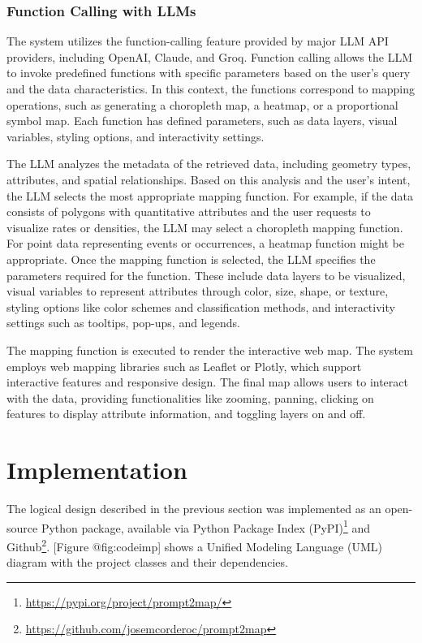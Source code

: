\subsubsection{Function Calling with LLMs}
The system utilizes the function-calling feature provided by major LLM API providers, including OpenAI, Claude, and Groq. Function calling allows the LLM to invoke predefined functions with specific parameters based on the user's query and the data characteristics. In this context, the functions correspond to mapping operations, such as generating a choropleth map, a heatmap, or a proportional symbol map. Each function has defined parameters, such as data layers, visual variables, styling options, and interactivity settings.

The LLM analyzes the metadata of the retrieved data, including geometry types, attributes, and spatial relationships. Based on this analysis and the user's intent, the LLM selects the most appropriate mapping function. For example, if the data consists of polygons with quantitative attributes and the user requests to visualize rates or densities, the LLM may select a choropleth mapping function. For point data representing events or occurrences, a heatmap function might be appropriate. Once the mapping function is selected, the LLM specifies the parameters required for the function. These include data layers to be visualized, visual variables to represent attributes through color, size, shape, or texture, styling options like color schemes and classification methods, and interactivity settings such as tooltips, pop-ups, and legends.

The mapping function is executed to render the interactive web map. The system employs web mapping libraries such as Leaflet or Plotly, which support interactive features and responsive design. The final map allows users to interact with the data, providing functionalities like zooming, panning, clicking on features to display attribute information, and toggling layers on and off.

\section{Implementation}

The logical design described in the previous section was implemented as an open-source Python package, available via Python Package Index (PyPI)\footnote{\url{https://pypi.org/project/prompt2map/}} and  Github\footnote{\url{https://github.com/josemcorderoc/prompt2map}}. [Figure @fig:codeimp] shows a Unified Modeling Language (UML) diagram with the project classes and their dependencies.

